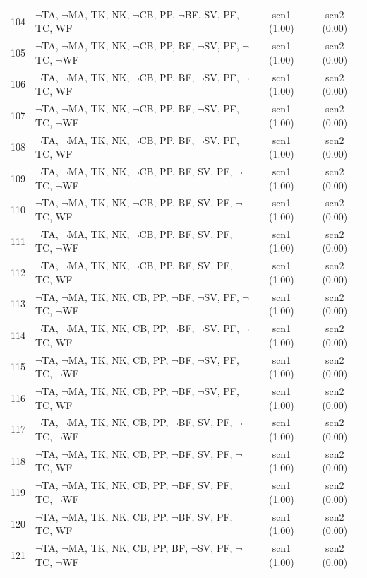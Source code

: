 \documentclass[12pt]{article}
\begin{document}
\begin{longtable}{|l|l|c|c|}
104 & $\neg$TA, $\neg$MA, TK, NK, $\neg$CB, PP, $\neg$BF, SV, PF, TC, WF & scn1 (1.00) & scn2 (0.00)\\
105 & $\neg$TA, $\neg$MA, TK, NK, $\neg$CB, PP, BF, $\neg$SV, PF, $\neg$TC, $\neg$WF & scn1 (1.00) & scn2 (0.00)\\
106 & $\neg$TA, $\neg$MA, TK, NK, $\neg$CB, PP, BF, $\neg$SV, PF, $\neg$TC, WF & scn1 (1.00) & scn2 (0.00)\\
107 & $\neg$TA, $\neg$MA, TK, NK, $\neg$CB, PP, BF, $\neg$SV, PF, TC, $\neg$WF & scn1 (1.00) & scn2 (0.00)\\
108 & $\neg$TA, $\neg$MA, TK, NK, $\neg$CB, PP, BF, $\neg$SV, PF, TC, WF & scn1 (1.00) & scn2 (0.00)\\
109 & $\neg$TA, $\neg$MA, TK, NK, $\neg$CB, PP, BF, SV, PF, $\neg$TC, $\neg$WF & scn1 (1.00) & scn2 (0.00)\\
110 & $\neg$TA, $\neg$MA, TK, NK, $\neg$CB, PP, BF, SV, PF, $\neg$TC, WF & scn1 (1.00) & scn2 (0.00)\\
111 & $\neg$TA, $\neg$MA, TK, NK, $\neg$CB, PP, BF, SV, PF, TC, $\neg$WF & scn1 (1.00) & scn2 (0.00)\\
112 & $\neg$TA, $\neg$MA, TK, NK, $\neg$CB, PP, BF, SV, PF, TC, WF & scn1 (1.00) & scn2 (0.00)\\
113 & $\neg$TA, $\neg$MA, TK, NK, CB, PP, $\neg$BF, $\neg$SV, PF, $\neg$TC, $\neg$WF & scn1 (1.00) & scn2 (0.00)\\
114 & $\neg$TA, $\neg$MA, TK, NK, CB, PP, $\neg$BF, $\neg$SV, PF, $\neg$TC, WF & scn1 (1.00) & scn2 (0.00)\\
115 & $\neg$TA, $\neg$MA, TK, NK, CB, PP, $\neg$BF, $\neg$SV, PF, TC, $\neg$WF & scn1 (1.00) & scn2 (0.00)\\
116 & $\neg$TA, $\neg$MA, TK, NK, CB, PP, $\neg$BF, $\neg$SV, PF, TC, WF & scn1 (1.00) & scn2 (0.00)\\
117 & $\neg$TA, $\neg$MA, TK, NK, CB, PP, $\neg$BF, SV, PF, $\neg$TC, $\neg$WF & scn1 (1.00) & scn2 (0.00)\\
118 & $\neg$TA, $\neg$MA, TK, NK, CB, PP, $\neg$BF, SV, PF, $\neg$TC, WF & scn1 (1.00) & scn2 (0.00)\\
119 & $\neg$TA, $\neg$MA, TK, NK, CB, PP, $\neg$BF, SV, PF, TC, $\neg$WF & scn1 (1.00) & scn2 (0.00)\\
120 & $\neg$TA, $\neg$MA, TK, NK, CB, PP, $\neg$BF, SV, PF, TC, WF & scn1 (1.00) & scn2 (0.00)\\
121 & $\neg$TA, $\neg$MA, TK, NK, CB, PP, BF, $\neg$SV, PF, $\neg$TC, $\neg$WF & scn1 (1.00) & scn2 (0.00)\\

\end{longtable}
\end{document}
